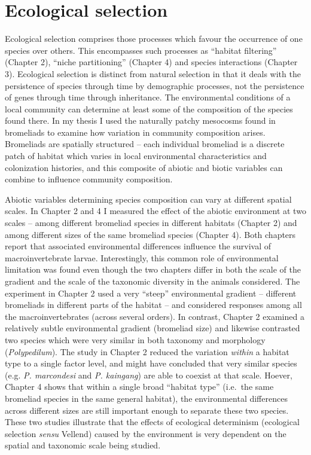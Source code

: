 \section{Ecological selection}\label{ecological-selection}

Ecological selection comprises those processes which favour the
occurrence of one species over others. This encompasses such processes
as ``habitat filtering'' (Chapter 2), ``niche partitioning'' (Chapter 4)
and species interactions (Chapter 3). Ecological selection is distinct
from natural selection in that it deals with the persistence of species
through time by demographic processes, not the persistence of genes
through time through inheritance. The environmental conditions of a
local community can determine at least some of the composition of the
species found there. In my thesis I used the naturally patchy mesocosms
found in bromeliads to examine how variation in community composition
arises. Bromeliads are spatially structured -- each individual bromeliad
is a discrete patch of habitat which varies in local environmental
characteristics and colonization histories, and this composite of
abiotic and biotic variables can combine to influence community
composition.

Abiotic variables determining species composition can vary at different
spatial scales. In Chapter 2 and 4 I measured the effect of the abiotic
environment at two scales -- among different bromeliad species in
different habitats (Chapter 2) and among different sizes of the same
bromeliad species (Chapter 4). Both chapters report that associated
environmental differences influence the survival of macroinvertebrate
larvae. Interestingly, this common role of environmental limitation was
found even though the two chapters differ in both the scale of the
gradient and the scale of the taxonomic diversity in the animals
considered. The experiment in Chapter 2 used a very ``steep''
environmental gradient -- different bromeliads in different parts of the
habitat -- and considered responses among all the macroinvertebrates
(across several orders). In contrast, Chapter 2 examined a relatively
subtle environmental gradient (bromeliad size) and likewise contrasted
two species which were very similar in both taxonomy and morphology
(\emph{Polypedilum}). The study in Chapter 2 reduced the variation
\emph{within} a habitat type to a single factor level, and might have
concluded that very similar species (e.g. \emph{P. marcondesi} and
\emph{P. kaingang}) are able to coexist at that scale. Hoever, Chapter 4
shows that within a single broad ``habitat type'' (i.e.~the same
bromeliad species in the same general habitat), the environmental
differences across different sizes are still important enough to
separate these two species. These two studies illustrate that the
effects of ecological determinism (ecological selection \emph{sensu}
Vellend) caused by the environment is very dependent on the spatial and
taxonomic scale being studied.

